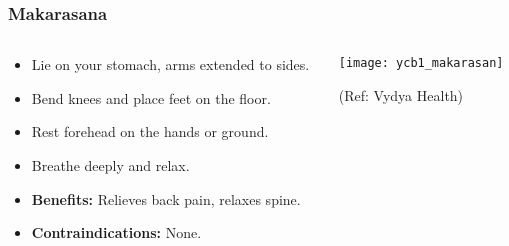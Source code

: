 \begin{frame}[fragile]\frametitle{Makarasana}
\begin{columns}
    \begin{column}[T]{0.5\linewidth}
      \begin{itemize}
        \item Lie on your stomach, arms extended to sides.
        \item Bend knees and place feet on the floor.
        \item Rest forehead on the hands or ground.
        \item Breathe deeply and relax.
        \item \textbf{Benefits:} Relieves back pain, relaxes spine.
        \item \textbf{Contraindications:} None.
      \end{itemize}
    \end{column}
    \begin{column}[T]{0.5\linewidth}
        \begin{center}
        \begin{center}
		        \texttt{[image: ycb1\_makarasan]}
				
				{\tiny (Ref: Vydya Health)}	        
		\end{center}   
        \end{center}    
    \end{column}
  \end{columns}
\end{frame}


